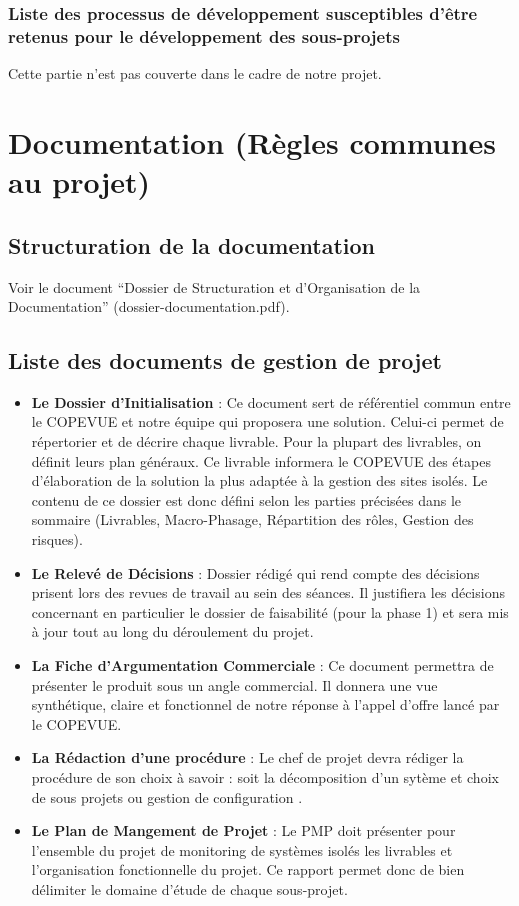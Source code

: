 \documentclass[a4paper]{article}
\begin{document}
\subsubsection{Liste des processus de développement susceptibles d'être retenus pour le développement des sous-projets}
Cette partie n'est pas couverte dans le cadre de notre projet.

\section{Documentation (Règles communes au projet)}

\subsection{Structuration de la documentation}

Voir le document ``Dossier de Structuration et d'Organisation de la Documentation'' (dossier-documentation.pdf).

\subsection{Liste des documents de gestion de projet}

\begin{itemize}
\item \textbf{Le Dossier d'Initialisation} : Ce document sert de référentiel commun entre le COPEVUE et notre équipe qui proposera une solution. Celui-ci permet de répertorier et de décrire chaque livrable. Pour la plupart des livrables, on définit leurs plan généraux. Ce livrable informera le COPEVUE des étapes d'élaboration de la solution la plus adaptée à la gestion des sites isolés. Le contenu de ce dossier est donc défini selon les parties précisées dans le sommaire (Livrables, Macro-Phasage, Répartition des rôles, Gestion des risques).
\item \textbf{Le Relevé de Décisions} : Dossier rédigé qui rend compte des décisions prisent lors des revues de travail au sein des séances. Il justifiera les décisions concernant en particulier le dossier de faisabilité (pour la phase 1) et sera mis à jour tout au long du déroulement du projet.
\item \textbf{La Fiche d'Argumentation Commerciale} : Ce document permettra de présenter le produit sous un angle commercial. Il donnera une vue synthétique, claire et fonctionnel de notre réponse à l'appel d'offre lancé par le COPEVUE.
\item \textbf{La Rédaction d'une procédure} : Le chef de projet devra rédiger la procédure de son choix à savoir : soit la \og décomposition d'un sytème et choix de sous projets \fg ou \og gestion de configuration \fg.
\item \textbf{Le Plan de Mangement de Projet} : Le PMP doit présenter pour l'ensemble du projet de monitoring de systèmes isolés les livrables et l'organisation fonctionnelle du projet. Ce rapport permet donc de bien délimiter le domaine d'étude de chaque sous-projet.
\end{itemize}
\end{document}
